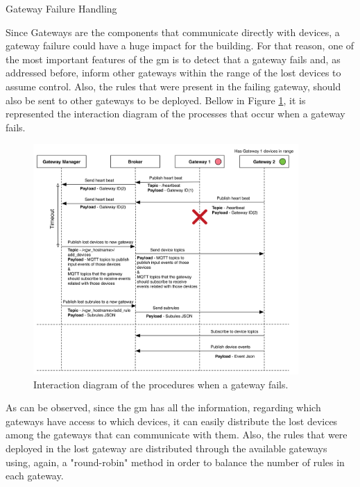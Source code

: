 \begin{Paragraph}{Gateway Failure Handling}
	
Since Gateways are the components that communicate directly with devices, a gateway failure could have a huge impact for the building. For that reason, one of the most important features of the \ac{gm} is to detect that a gateway fails and, as addressed before, inform other gateways within the range of the lost devices to assume control. Also, the rules that were present in the failing gateway, should also be sent to other gateways to be deployed. Bellow in Figure \ref{fig:gwdown}, it is represented the interaction diagram of the processes that occur when a gateway fails. 

\begin{figure}[H]
	\centering
	\includegraphics[width=0.9\textwidth]{figures/gwdown.png}
	\caption{Interaction diagram of the procedures when a gateway fails.}
	\label{fig:gwdown}
\end{figure}
	
As can be observed, since the \ac{gm} has all the information, regarding which gateways have access to which devices, it can easily distribute the lost devices among the gateways that can communicate with them. Also, the rules that were deployed in the lost gateway are distributed through the available gateways using, again, a "round-robin" method in order to balance the number of rules in each gateway.  

\end{Paragraph}

